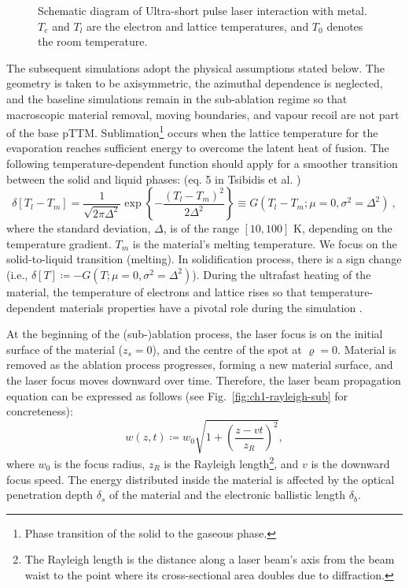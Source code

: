 \begin{figure}[htbp]
  \centering
  \PublicFigureOmitted[0.85\linewidth]
  \caption{Schematic diagram of Ultra-short pulse laser interaction with metal. \(T_e\) and \(T_l\) are the electron and lattice temperatures, and \(T_0\) denotes the room temperature. \cite{Vaghasiya_2023}}
  \label{fig:ch1-ulp-metals}
\end{figure}

The subsequent simulations adopt the physical assumptions stated below. The geometry is taken to be axisymmetric, the azimuthal dependence is neglected, and the baseline simulations remain in the sub-ablation regime so that macroscopic material removal, moving boundaries, and vapour recoil are not part of the base pTTM.
Sublimation\footnote{Phase transition of the solid to the gaseous phase.} occurs when the lattice temperature for the
evaporation reaches sufficient energy to overcome the latent heat of fusion. The following temperature-dependent function should apply for a smoother
transition between the solid and liquid phases\cite{Grigoropoulos_1986}: (eq. 5 in Tsibidis et al. \cite{Tsibidis_2012})
\begin{equation}
  \delta [T_l - T_m] = \frac{1}{\sqrt{2\pi \Delta^2}} \exp \left\{ - \frac{(T_l - T_m)^2}{2 \Delta^2} \right\} \equiv G(T_l - T_m ; \mu = 0, \sigma^2 = \Delta^2) \ ,
\end{equation}
where the standard deviation, $\Delta$, is of the range $[10, 100]$ K, depending on the temperature gradient.
$T_m$ is the material's melting temperature. We focus on the solid-to-liquid transition (melting).
In solidification process, there is a sign change (i.e., $\delta[T] \coloneqq - G(T; \mu=0, \sigma^2=\Delta^2)$).
During the ultrafast heating of the material, the temperature of electrons and lattice rises so that temperature-dependent materials properties have a pivotal role
during the simulation \cite{Vaghasiya_2023}.

At the beginning of the (sub-)ablation process, the laser focus is on the initial surface of the material
($z_s = 0$), and the centre of the spot at $\varrho = 0$.
Material is removed as the ablation process progresses,
forming a new material surface, and the laser focus moves downward over time. Therefore, the
laser beam propagation equation can be expressed as follows (see Fig.~\ref{fig:ch1-rayleigh-sub} for concreteness):
\begin{equation}
  w(z,t) \coloneqq w_0 \sqrt{1 + \left(\frac{z - v t}{z_R}\right)^2},
  \label{eq:ch1-beam_propagation}
\end{equation}
where $w_0$ is the focus radius, $z_R$ is the Rayleigh length\footnote{The Rayleigh length is the distance along a laser beam's axis from the beam waist to the point where its cross-sectional area doubles due to diffraction.}, and $v$ is the downward focus speed.
The energy distributed inside the material is affected by the optical
penetration depth $\delta_s$ of the material and the electronic ballistic length $\delta_b$.\\

